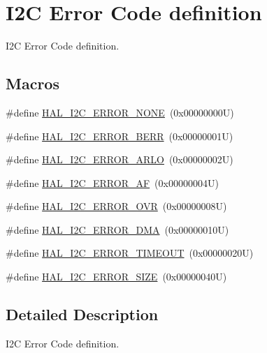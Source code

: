 \hypertarget{group___i2_c___error___code__definition}{}\section{I2C Error Code definition}
\label{group___i2_c___error___code__definition}


I2C Error Code definition.  


\subsection*{Macros}
\begin{DoxyCompactItemize}
\item 
\#define \hyperlink{group___i2_c___error___code__definition_ga0b8ca289091d942032c89484b6211d0d}{H\+A\+L\+\_\+\+I2\+C\+\_\+\+E\+R\+R\+O\+R\+\_\+\+N\+O\+NE}~(0x00000000\+U)
\item 
\#define \hyperlink{group___i2_c___error___code__definition_gab9f6e39431ee764ada50fd63f0ad2fbf}{H\+A\+L\+\_\+\+I2\+C\+\_\+\+E\+R\+R\+O\+R\+\_\+\+B\+E\+RR}~(0x00000001\+U)
\item 
\#define \hyperlink{group___i2_c___error___code__definition_ga048b36222884bfe80ce2d37fa868690b}{H\+A\+L\+\_\+\+I2\+C\+\_\+\+E\+R\+R\+O\+R\+\_\+\+A\+R\+LO}~(0x00000002\+U)
\item 
\#define \hyperlink{group___i2_c___error___code__definition_gad1cc236ad6ba5cafe66aecb0dbedc65a}{H\+A\+L\+\_\+\+I2\+C\+\_\+\+E\+R\+R\+O\+R\+\_\+\+AF}~(0x00000004\+U)
\item 
\#define \hyperlink{group___i2_c___error___code__definition_ga38d8f9beb4c681eba786f6154d4f594a}{H\+A\+L\+\_\+\+I2\+C\+\_\+\+E\+R\+R\+O\+R\+\_\+\+O\+VR}~(0x00000008\+U)
\item 
\#define \hyperlink{group___i2_c___error___code__definition_gae1091e9e82dcfcfef247b214a11c9db3}{H\+A\+L\+\_\+\+I2\+C\+\_\+\+E\+R\+R\+O\+R\+\_\+\+D\+MA}~(0x00000010\+U)
\item 
\#define \hyperlink{group___i2_c___error___code__definition_gaeb3bedf36d78ddf3284a68494ab9d089}{H\+A\+L\+\_\+\+I2\+C\+\_\+\+E\+R\+R\+O\+R\+\_\+\+T\+I\+M\+E\+O\+UT}~(0x00000020\+U)
\item 
\#define \hyperlink{group___i2_c___error___code__definition_ga98027ff2d2fda2c793b07168ded747a4}{H\+A\+L\+\_\+\+I2\+C\+\_\+\+E\+R\+R\+O\+R\+\_\+\+S\+I\+ZE}~(0x00000040\+U)
\end{DoxyCompactItemize}


\subsection{Detailed Description}
I2C Error Code definition. 



